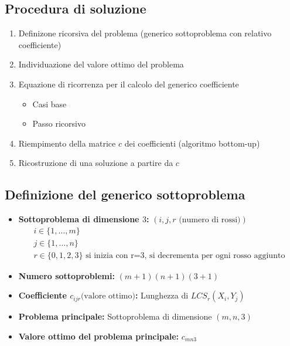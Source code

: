 \subsection{Procedura di soluzione}
\begin{enumerate}
    \item Definizone ricorsiva del problema (generico sottoproblema con relativo coefficiente)
    \item Individuazione del valore ottimo del problema
    \item Equazione di ricorrenza per il calcolo del generico coefficiente
    \begin{itemize}
        \item Casi base
        \item Passo ricorsivo
    \end{itemize}
    \item Riempimento della matrice $c$ dei coefficienti (algoritmo bottom-up)
    \item Ricostruzione di una soluzione a partire da $c$
\end{enumerate}

\newpage
\subsection{Definizione del generico sottoproblema}
\begin{itemize}
    \item \textbf{Sottoproblema di dimensione $3$:} $(i,j,r\text{ (numero di rossi)})$
    \begin{gather*}
        i \in \{1, \dots, m\} \\
        j \in \{1, \dots, n\} \\ 
        r \in \{0,1,2,3\} \text{ si inizia con r=3, si decrementa per ogni rosso aggiunto}
    \end{gather*}
    
    \item \textbf{Numero sottoproblemi:} $(m+1)(n+1)(3+1)$
    \item \textbf{Coefficiente $c_{ijr}\text{(valore ottimo)}$:} Lunghezza di $LCS_r(X_i,Y_j)$
    \item \textbf{Problema principale:} Sottoproblema di dimensione $(m,n,3)$
    \item \textbf{Valore ottimo del problema principale:} $c_{mn3}$
\end{itemize}

